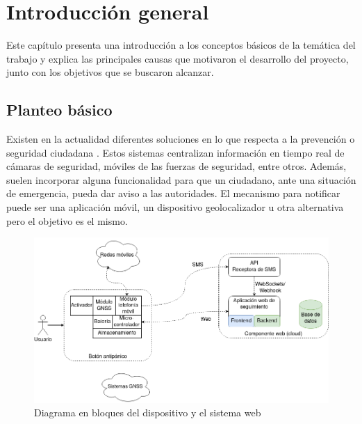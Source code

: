 
\chapter{Introducción general} %

\label{Chapter1} %
\label{IntroGeneral}


\newcommand{\keyword}[1]{\textbf{#1}}
\newcommand{\tabhead}[1]{\textbf{#1}}
\newcommand{\code}[1]{\texttt{#1}}
\newcommand{\file}[1]{\texttt{\bfseries#1}}
\newcommand{\option}[1]{\texttt{\itshape#1}}
\newcommand{\grados}{$^{\circ}$}



Este capítulo presenta una introducción a los conceptos básicos de la temática del trabajo y explica las principales causas que motivaron el desarrollo del proyecto, junto con los objetivos que se buscaron alcanzar.

\section{Planteo básico}

Existen en la actualidad diferentes soluciones en lo que respecta a la prevención o seguridad ciudadana \citep{PNUD:1}. Estos sistemas centralizan información en tiempo real de cámaras de seguridad, móviles de las fuerzas de seguridad, entre otros. Además, suelen incorporar alguna funcionalidad para que un ciudadano, ante una situación de emergencia, pueda dar aviso a las autoridades. El mecanismo para notificar puede ser una aplicación móvil, un dispositivo geolocalizador u otra alternativa pero el objetivo es el mismo.

\begin{figure}[htbp]
	\centering
	\includegraphics[width=.9\textwidth]{./Figures/diagBloques.png}
	\caption{Diagrama en bloques del dispositivo y el sistema web}
	\label{fig:texmaker}
\end{figure}

